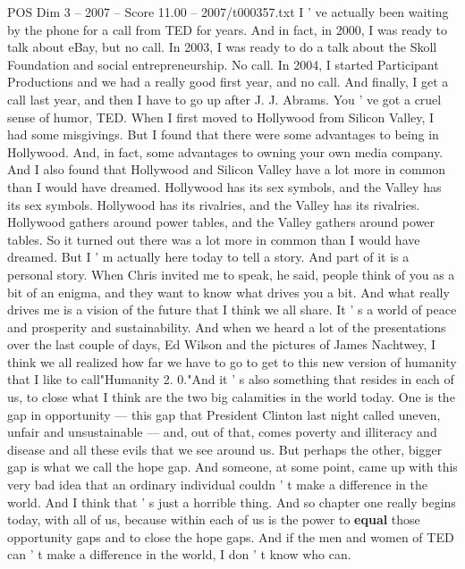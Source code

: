 \begin{textsample}{POS Dim 3 – 2007 – Score 11.00 – 2007/t000357.txt}  \label{ex:f3_pos_042}
I ' ve actually been waiting by the phone for a call from TED for years.
And in fact, in 2000, I was ready to talk about eBay, but no call.
In 2003, I was ready to do a talk about the Skoll Foundation and social entrepreneurship.
No call.
In 2004, I started Participant Productions and we had a really good first year, and no call.
And finally, I get a call last year, and then I have to go up after J.
J.
Abrams.
You ' ve got a cruel sense of humor, TED.
When I first moved to Hollywood from Silicon Valley, I had some misgivings.
But I found that there were some advantages to being in Hollywood.
And, in fact, some advantages to owning your own media company.
And I also found that Hollywood and Silicon Valley have a lot more in common than I would have dreamed.
Hollywood has its sex symbols, and the Valley has its sex symbols.
Hollywood has its rivalries, and the Valley has its rivalries.
Hollywood gathers around power tables, and the Valley gathers around power tables.
So it turned out there was a lot more in common than I would have dreamed.
But I ' m actually here today to tell a story.
And part of it is a personal story.
When Chris invited me to speak, he said, people think of you as a bit of an enigma, and they want to know what drives you a bit.
And what really drives me is a vision of the future that I think we all share.
It ' s a world of peace and prosperity and sustainability.
And when we heard a lot of the presentations over the last couple of days, Ed Wilson and the pictures of James Nachtwey, I think we all realized how far we have to go to get to this new version of humanity that I like to call"Humanity 2. 0."And it ' s also something that resides in each of us, to close what I think are the two big calamities in the world today.
One is the gap in opportunity — this gap that President Clinton last night called uneven, unfair and unsustainable — and, out of that, comes poverty and illiteracy and disease and all these evils that we see around us.
But perhaps the other, bigger gap is what we call the hope gap.
And someone, at some point, came up with this very bad idea that an ordinary individual couldn ' t make a difference in the world.
And I think that ' s just a horrible thing.
And so chapter one really begins today, with all of us, because within each of us is the power to \textbf{equal} those opportunity gaps and to close the hope gaps.
And if the men and women of TED can ' t make a difference in the world, I don ' t know who can.

\end{textsample}
